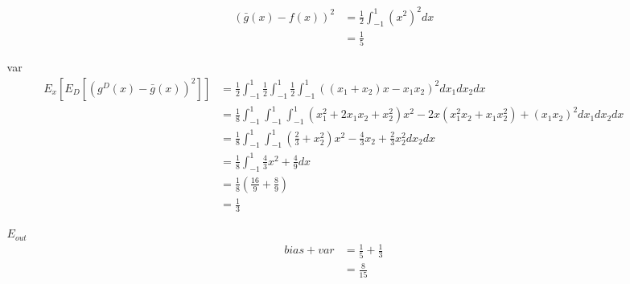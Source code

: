 \documentclass{article}
\def\math#1{$#1$}
\begin{document}
\begin{enumerate}[a)]
\begin{itemize}
\begin{equation}
                    \begin{split}
                        (\bar{g}(x) - f(x))^2 &= \frac{1}{2} \int^1_{-1} (x^2)^2dx \\
                        &= \frac{1}{5}
                    \end{split}
                \end{equation}
            \item [var] 
                \begin{equation}
                    \begin{split}
                        E_x[E_{D}[{(g^D(x) - \bar{g}(x))}^2]] &= \frac{1}{2}\int^1_{-1}\frac{1}{2}\int^1_{-1}\frac{1}{2}\int^1_{-1}((x_1 + x_2)x - x_1x_2)^2 dx_1dx_2dx \\
                        &= \frac{1}{8}\int^1_{-1}\int^1_{-1}\int^1_{-1} (x_1^2 + 2x_1x_2 + x_2^2)x^2 - 2x(x_1^2x_2+x_1x_2^2) + (x_1x_2)^2 dx_1dx_2dx \\
                        &= \frac{1}{8}\int^1_{-1}\int^1_{-1} (\frac{2}{3} + x_2^2)x^2 - \frac{4}{3}x_2 + \frac{2}{3}x_2^2 dx_2dx \\
                        &= \frac{1}{8} \int^1_{-1} \frac{4}{3}x^2 + \frac{4}{9} dx \\
                        &= \frac{1}{8}(\frac{16}{9} + \frac{8}{9}) \\
                        &= \frac{1}{3}
                    \end{split}
                \end{equation}
            \item [\math{E_{out}}] 
                \begin{equation}
                    \begin{split}
                        bias + var &= \frac{1}{5} + \frac{1}{3} \\
                        &= \frac{8}{15}
                    \end{split}
                \end{equation}
        \end{itemize}
\end{enumerate}
\end{document}
